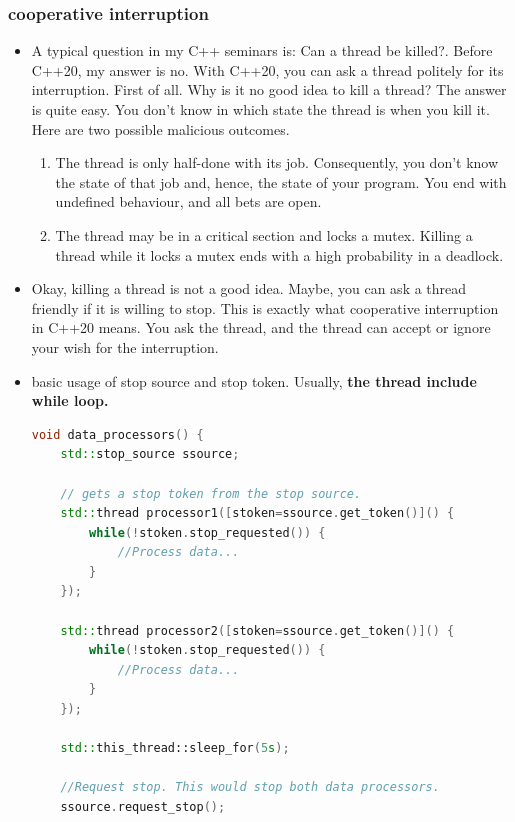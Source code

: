 \documentclass[a4paper,11pt,twoside]{book}
\begin{document}
\subsubsection{cooperative interruption}

\begin{itemize}
	\item A typical question in my C++ seminars is: Can a thread be killed?. Before C++20, my answer is no. With C++20, you can ask a thread politely for its interruption. First of all. Why is it no good idea to kill a thread? The answer is quite easy. You don't know in which state the thread is when you kill it. Here are two possible malicious outcomes.

	\begin{enumerate}
		\item 	The thread is only half-done with its job. Consequently, you don't know the state of that job and, hence, the state of your program. You end with undefined behaviour, and all bets are open.
		
		\item 	The thread may be in a critical section and locks a mutex. Killing a thread while it locks a mutex ends with a high probability in a deadlock.
		
	\end{enumerate}
	
	\item Okay, killing a thread is not a good idea. Maybe, you can ask a thread friendly if it is willing to stop. This is exactly what cooperative interruption in C++20 means. You ask the thread, and the thread can accept or ignore your wish for the interruption.
	
	\item basic usage of stop source and stop token. Usually, \textbf{the thread include while loop. }
\begin{lstlisting}[frame=single, language=c++]	
void data_processors() {
	std::stop_source ssource;
	
	// gets a stop token from the stop source.
	std::thread processor1([stoken=ssource.get_token()]() {
		while(!stoken.stop_requested()) {
			//Process data...
		}     
	});    

	std::thread processor2([stoken=ssource.get_token()]() {
		while(!stoken.stop_requested()) {
			//Process data...
		}     
	});
	
	std::this_thread::sleep_for(5s);
	
	//Request stop. This would stop both data processors.
	ssource.request_stop();
	

\end{lstlisting}
\end{itemize}
\end{document}
